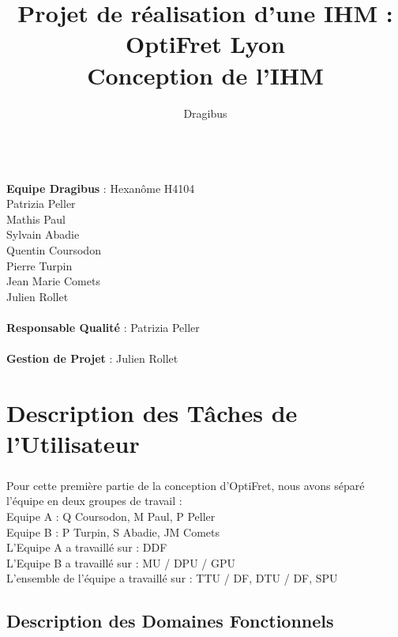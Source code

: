 \documentclass{report}
\begin{document}
\title {Projet de réalisation d'une IHM : OptiFret Lyon \\ Conception de l'IHM}
\author{Dragibus}
\maketitle


\newpage
~~\\
\textbf{Equipe Dragibus} : Hexanôme H4104 \\
Patrizia Peller\\
Mathis Paul\\
Sylvain Abadie\\
Quentin Coursodon\\
Pierre Turpin\\
Jean Marie Comets\\
Julien Rollet\\

~~\\
\textbf{Responsable Qualité} : Patrizia Peller\\
~~\\
\textbf{Gestion de Projet} : Julien Rollet\\


\newpage
\tableofcontents
\newpage



\chapter{Description des Tâches de l'Utilisateur}

\paragraph{}
Pour cette première partie de la conception d'OptiFret, nous avons séparé l'équipe en deux groupes de travail :\\
Equipe A : Q Coursodon, M Paul, P Peller \\
Equipe B : P Turpin, S Abadie, JM Comets\\

L'Equipe A a travaillé sur : DDF \\

L'Equipe B a travaillé sur : MU / DPU / GPU \\

L’ensemble de l’équipe a travaillé sur : TTU / DF, DTU / DF, SPU \\


\section{Description des Domaines Fonctionnels}
\end{document}
